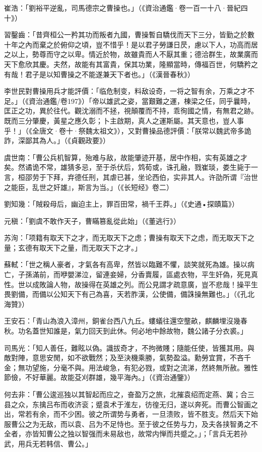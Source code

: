 崔浩：「劉裕平逆亂，司馬德宗之曹操也。」（《資治通鑑·卷一百一十八·晉紀四十》）

習鑿齒：「昔齊桓公一矜其功而叛者九國，曹操暫自驕伐而天下三分，皆勤之於數十年之內而棄之於俯仰之頃，豈不惜乎！是以君子勞謙日昃，慮以下人，功高而居之以上，勢尊而守之以卑。情近於物，故雖貴而人不厭其重；德洽群生，故業廣而天下愈欣其慶。夫然，故能有其富貴，保其功業，隆顯當時，傳福百世，何驕矜之有哉！君子是以知曹操之不能遂兼天下者也。」（《漢晉春秋》）

李世民對曹操用兵才能評價：「临危制变，料敌设奇，一将之智有余，万乘之才不足。」（《資治通鑑/卷197》）「帝以雄武之姿，當艱難之運，棟梁之任，同乎曩時，匡正之功，異於往代。觀沈溺而不拯，視顛覆而不持，乖徇國之情，有無君之跡。既而三分肇慶，黃星之應久彰；卜主啟期，真人之運斯屬。其天意也，豈人事乎！」（《全唐文·卷十·祭魏太祖文》），又對曹操品德評價：「朕常以魏武帝多詭詐，深鄙其為人。」（《貞觀政要》）

虞世南：「曹公兵机智算，殆难与敌，故能肇迹开基，居中作相，实有英雄之才矣。然谲诡不常，雄猜多忌，至于杀伏后，鸩荀或，诛孔融，戮崔琰，娄生毙于一言，桓邵劳于下拜，弃德任刑，其虐已甚，坐论西伯，实非其人。许劭所谓『治世之能臣，乱世之奸雄』，斯言为当。」（《长短经》卷二）

劉知幾：「賊殺母后，幽迫主上，罪百田常，禍千王莽。」（《史通•探賾篇》）

元稹：「劉虞不敢作天子，曹瞞篡亂從此始」（《董逃行》）

苏洵：「项籍有取天下之才，而无取天下之虑；曹操有取天下之虑，而无取天下之量；玄德有取天下之量，而无取天下之才。」

蘇軾：「世之稱人豪者，才氣各有高卑，然皆以臨難不懼，談笑就死為雄。操以病亡，子孫滿前，而咿嬰涕泣，留連妾婦，分香賣履，區處衣物，平生奸偽，死見真性。世以成敗論人物，故操得在英雄之列。而公見謂才疏意廣，豈不悲哉！操平生畏劉備，而備以公知天下有己為喜，天若胙漢，公使備，備誅操無難也。」（《孔北海贊》）

王安石：「青山為浪入漳州，銅雀台西八九丘。螻蟻往還空壟畝，麒麟埋沒幾春秋。功名蓋世知誰是，氣力回天到此休。何必地中餘故物，魏公諸子分衣裘。」

司馬光：「知人善任，難眩以偽。識拔奇才，不拘微賤；隨能任使，皆獲其用。與敵對陣，意思安閒，如不欲戰然；及至決機乘勝，氣勢盈溢。勳勞宜賞，不吝千金；無功望施，分毫不與。用法峻急，有犯必戮，或對之流涕，然終無所赦。雅性節儉，不好華麗。故能芟刈群雄，幾平海內。」（《資治通鑒》）

何去非：「曹公逡巡独以其智起而应之，奋盈万之旅，北摧袁绍而定燕、冀；合三县之众，东擒吕布而收济衮；蹙袁术于淮左，彷徨无归，遂以奔死。而曹公智画之出，常若有余，而不少困。彼之所谓势与勇者，一旦溃败，皆不胜支。然后天下始服曹公之为无敌，而以袁、吕为不足恃也。至于彼之任势与力，及夫各挟智勇之不全者，亦皆知曹公之独以智强而未易敌也，故常内惮而共蹙之。」；「言兵无若孙武，用兵无若韩信、曹公。」


